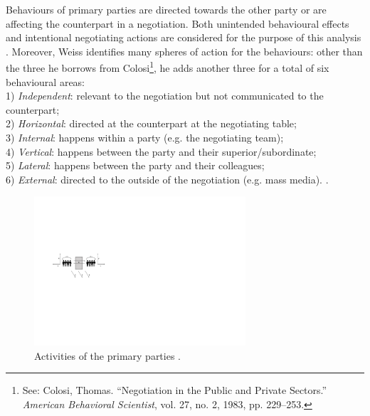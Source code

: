 \documentclass[../main.tex]{subfiles}
\begin{document}
Behaviours of primary parties are directed towards the other party or are affecting the counterpart in a negotiation. Both unintended behavioural effects and intentional negotiating actions are considered for the purpose of this analysis \autocite[279]{weiss}.
Moreover, Weiss identifies many spheres of action for the behaviours: other than the three he borrows from Colosi\footnote{See: Colosi, Thomas. “Negotiation in the Public and Private Sectors.” \textit{American Behavioral Scientist}, vol. 27, no. 2, 1983, pp. 229–253.}, he adds another three for a total of six behavioural areas:\\
1) \textit{Independent}: relevant to the negotiation but not communicated to the counterpart;\\
2) \textit{Horizontal}: directed at the counterpart at the negotiating table;\\
3) \textit{Internal}: happens within a party (e.g. the negotiating team);\\
4) \textit{Vertical}: happens between the party and their superior/subordinate;\\
5) \textit{Lateral}: happens between the party and their colleagues;\\
6) \textit{External}: directed to the outside of the negotiation (e.g. mass media). \mancite\autocite[286]{weiss}.

\begin{figure}[h]
    \centering\includegraphics[width=0.7\textwidth]{images/weissss.pdf}
    \caption{Activities of the primary parties \autocite[286]{weiss}.}
\end{figure}
\end{document}
